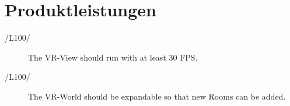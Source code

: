 \section{Produktleistungen}

\begin{description}
  \item[/L100/] The VR-View should run with at least 30 FPS.
\end{description}

\begin{description}
  \item[/L100/] The VR-World should be expandable so that new Rooms can be added.
\end{description}


